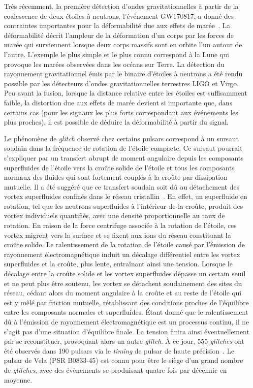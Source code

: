 Très récemment, la première détection d'ondes gravitationnelles à partir de la 
coalescence de deux étoiles à neutrons, l'événement GW170817, a donné des 
contraintes importantes pour la déformabilité due aux effets de 
marée~\cite{GW1}. 
La déformabilité décrit l'ampleur de la déformation d'un corps par les forces 
de marée qui surviennent lorsque deux corps massifs sont en orbite l'un autour 
de l'autre. L'exemple le plus simple et le plus connu correspond à la Lune qui 
provoque les marées observées dans les océans sur Terre. 
La détection du rayonnement gravitationnel émis par le binaire d'étoiles à
neutrons a été rendu possible par les détecteurs d'ondes gravitationnelles 
terrestres LIGO et Virgo. 
Peu avant la fusion, lorsque la distance relative entre les étoiles est
suffisamment faible, la distortion due aux effets de marée devient si 
importante que, dans certains cas (pour les signaux les plus forts 
correspondant aux événements les plus proches), il est possible de 
déduire la déformabilité à partir du signal. 

Le phénomène de \textit{glitch} observé chez certains pulsars correspond à un 
sursaut soudain dans la fréquence de rotation de l'étoile compacte. Ce sursaut 
pourrait s'expliquer par un transfert abrupt de moment angulaire 
depuis les composants superfluides de l'étoile vers la croûte solide de 
l'étoile et tous les composants normaux des fluides qui sont fortement couplés 
à la croûte par dissipation mutuelle. 
Il a été suggéré que ce transfert soudain soit dû au détachement des vortex 
superfluides confinés dans le réseau cristallin~\cite{Anderson1975}. 
%
En effet, un superfluide en rotation, tel que les neutrons superfluides à 
l'intérieur de la croûte, produit des vortex individuels quantifiés, avec une 
densité proportionnelle au taux de rotation. 
En raison de la force centrifuge associée à la rotation de l'étoile, ces vortex 
migrent vers la surface et se fixent aux ions du réseau constituant la croûte 
solide. Le ralentissement de la rotation de l'étoile causé par 
l'émission de rayonnement électromagnétique induit un décalage différentiel 
entre les vortex superfluides et la croûte, plus lente, entraînant
ainsi une tension. 
%
Lorsque le décalage entre la croûte solide et les vortex superfluides dépasse
un certain seuil et ne peut plus être soutenu, les vortex 
se détachent soudainement des sites du réseau, cédant alors du moment 
angulaire à la croûte et au reste de l'étoile qui est y mêlé par 
friction mutuelle, rétablissant des conditions proches de l'équilibre entre les 
composants normales et superfluides. 
Étant donné que le ralentissement dû à l'émission de rayonnement 
électromagnétique est un processus continu, il ne s'agit pas d'une situation 
d'équilibre finale. La tension finira ainsi éventuellement par se reconstituer, 
provoquant alors un autre \textit{glitch}. 
%
À ce jour, 555 \textit{glitches} ont été observés dans 190 pulsars via 
le \textit{timing} de pulsar de haute précision~\cite{Espinoza2011,Glitches}. 
Le pulsar de Vela (PSR B0833-45) est connu pour être le siège d'un grand nombre 
de \textit{glitches}, avec des évènements se produisant quatre fois par 
décennie en moyenne. 
\\

